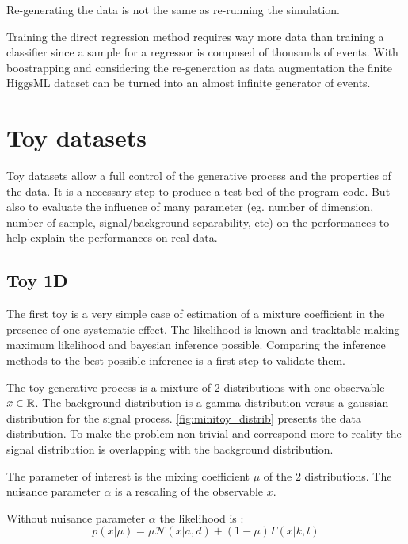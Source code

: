 Re-generating the data is not the same as re-running the simulation.

Training the direct regression method requires way more data than training a classifier since a sample for a regressor is composed of thousands of events.
With boostrapping and considering the re-generation as data augmentation the finite HiggsML dataset can be turned into an almost infinite generator of events.




\section{Toy datasets} %
\label{sec:toy_datasets}


Toy datasets allow a full control of the generative process and the properties of the data.
It is a necessary step to produce a test bed of the program code.
But also to evaluate the influence of many parameter (eg. number of dimension, number of sample, signal/background separability, etc) on the performances to help explain the performances on real data.






\subsection{Toy 1D} %
\label{sub:toy_1d}

The first toy is a very simple case of estimation of a mixture coefficient in the presence of one systematic effect.
The likelihood is known and tracktable making maximum likelihood and bayesian inference possible.
Comparing the inference methods to the best possible inference is a first step to validate them.


The toy generative process is a mixture of 2 distributions with one observable $x \in \mathbb{R}$.
The background distribution is a gamma distribution versus a gaussian distribution for the signal process.
\autoref{fig:minitoy_distrib} presents the data distribution.
To make the problem non trivial and correspond more to reality the signal distribution is overlapping with the background distribution.

The parameter of interest is the mixing coefficient $\mu$ of the 2 distributions.
The nuisance parameter $\alpha$ is a rescaling of the observable $x$.

Without nuisance parameter $\alpha$ the likelihood is :
$$
    p(x | \mu) = \mu \mathcal N(x|a, d) + (1-\mu) \Gamma(x|k, l)
$$

